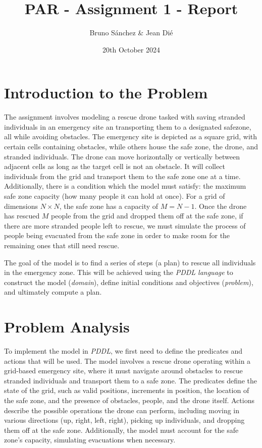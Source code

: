 \documentclass{article}
\begin{document}
\title{PAR - Assignment 1 - Report}
\author{\normalsize Bruno Sánchez \& Jean Dié}
\date{\small 20th October 2024}

\maketitle

\section{Introduction to the Problem}

The assignment involves modeling a rescue drone tasked with saving stranded individuals in an emergency site an transporting them to a designated safezone, all while avoiding obstacles. The emergency site is depicted as a square grid, with certain cells containing obstacles, while others house the safe zone, the drone, and stranded individuals. The drone can move horizontally or vertically between adjacent cells as long as the target cell is not an obstacle. It will collect individuals from the grid and transport them to the safe zone one at a time. Additionally, there is a condition which the model must satisfy: the maximum safe zone capacity (how many people it can hold at once). For a grid of dimensions \(N \times N\), the safe zone has a capacity of \(M = N - 1\). Once the drone has rescued \(M\) people from the grid and dropped them off at the safe zone, if there are more stranded people left to rescue, we must simulate the process of people being evacuated from the safe zone in order to make room for the remaining ones that still need rescue.

The goal of the model is to find a series of steps (a plan) to rescue all individuals in the emergency zone. This will be achieved using the \textit{PDDL language} to construct the model (\textit{domain}), define initial conditions and objectives (\textit{problem}), and ultimately compute a plan.

\section{Problem Analysis}

To implement the model in \textit{PDDL}, we first need to define the predicates and actions that will be used. The model involves a rescue drone operating within a grid-based emergency site, where it must navigate around obstacles to rescue stranded individuals and transport them to a safe zone. The predicates define the state of the grid, such as valid positions, increments in position, the location of the safe zone, and the presence of obstacles, people, and the drone itself. Actions describe the possible operations the drone can perform, including moving in various directions (up, right, left, right), picking up individuals, and dropping them off at the safe zone. Additionally, the model must account for the safe zone's capacity, simulating evacuations when necessary.
\end{document}
